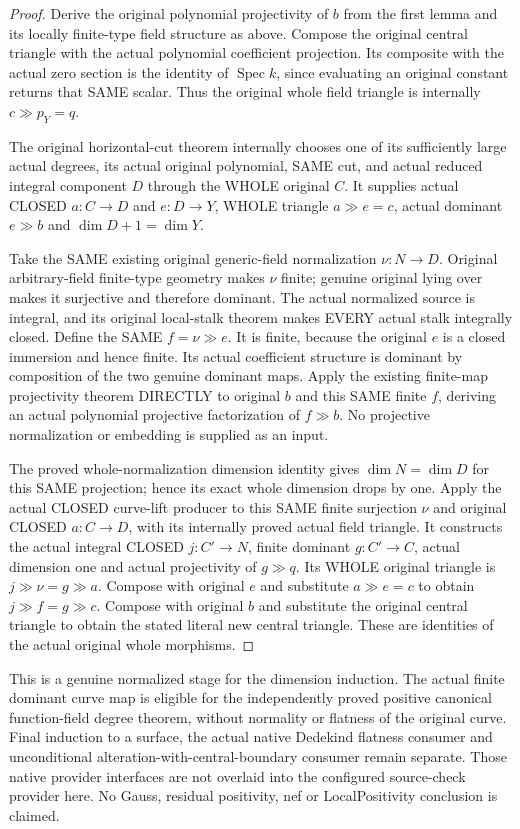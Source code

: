 \begin{proof}
Derive the original polynomial projectivity of $b$ from the first
lemma and its locally finite-type field structure as above. Compose
the original central triangle with the actual polynomial coefficient
projection. Its composite with the actual zero section is the
identity of $\operatorname{Spec}k$, since evaluating an original
constant returns that SAME scalar. Thus the original whole field
triangle is internally $c\gg p_Y=q$.

The original horizontal-cut theorem internally chooses one of its
sufficiently large actual degrees, its actual original polynomial,
SAME cut, and actual reduced integral component $D$ through the WHOLE
original $C$. It supplies actual CLOSED $a:C\to D$ and $e:D\to Y$,
WHOLE triangle $a\gg e=c$, actual dominant $e\gg b$ and
$\dim D+1=\dim Y$.

Take the SAME existing original generic-field normalization
$\nu:N\to D$. Original arbitrary-field finite-type geometry makes
$\nu$ finite; genuine original lying over makes it surjective and
therefore dominant. The actual normalized source is integral, and
its original local-stalk theorem makes EVERY actual stalk integrally
closed. Define the SAME $f=\nu\gg e$. It is finite, because the
original $e$ is a closed immersion and hence finite. Its actual
coefficient structure is dominant by composition of the two genuine
dominant maps. Apply the existing finite-map projectivity theorem
DIRECTLY to original $b$ and this SAME finite $f$, deriving an actual
polynomial projective factorization of $f\gg b$. No projective
normalization or embedding is supplied as an input.

The proved whole-normalization dimension identity gives
$\dim N=\dim D$ for this SAME projection; hence its exact whole
dimension drops by one. Apply the actual CLOSED curve-lift producer
to this SAME finite surjection $\nu$ and original CLOSED $a:C\to D$,
with its internally proved actual field triangle. It constructs the
actual integral CLOSED $j:C'\to N$, finite dominant $g:C'\to C$,
actual dimension one and actual projectivity of $g\gg q$.
Its WHOLE original triangle is $j\gg\nu=g\gg a$. Compose with
original $e$ and substitute $a\gg e=c$ to obtain $j\gg f=g\gg c$.
Compose with original $b$ and substitute the original central
triangle to obtain the stated literal new central triangle. These
are identities of the actual original whole morphisms.
\end{proof}

This is a genuine normalized stage for the dimension induction.
The actual finite dominant curve map is eligible for the independently
proved positive canonical function-field degree theorem, without
normality or flatness of the original curve. Final induction to a
surface, the actual native Dedekind flatness consumer and unconditional
alteration-with-central-boundary consumer remain separate. Those
native provider interfaces are not overlaid into the configured
source-check provider here. No Gauss, residual positivity, nef or
LocalPositivity conclusion is claimed.
